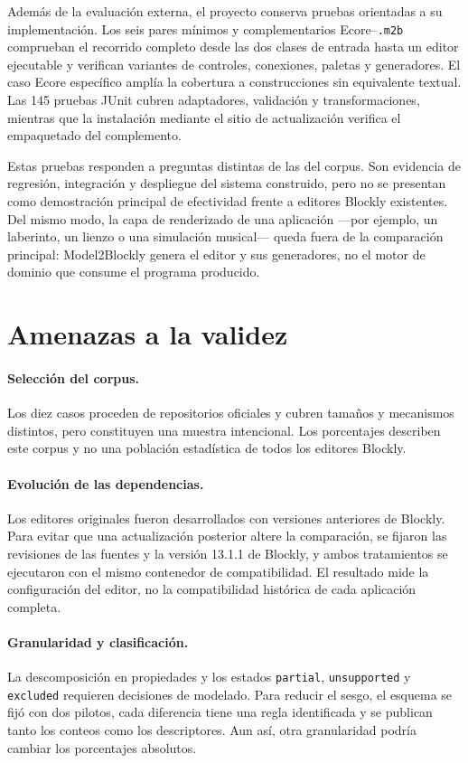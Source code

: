 Además de la evaluación externa, el proyecto conserva pruebas orientadas a su
implementación. Los seis pares mínimos y complementarios
Ecore--\texttt{.m2b} comprueban el recorrido completo desde las dos clases de
entrada hasta un editor ejecutable y verifican variantes de controles,
conexiones, paletas y generadores. El caso Ecore específico amplía la cobertura
a construcciones sin equivalente textual. Las 145 pruebas JUnit cubren
adaptadores, validación y transformaciones, mientras que la instalación mediante
el sitio de actualización verifica el empaquetado del complemento.

Estas pruebas responden a preguntas distintas de las del corpus. Son evidencia
de regresión, integración y despliegue del sistema construido, pero no se
presentan como demostración principal de efectividad frente a editores Blockly
existentes. Del mismo modo, la capa de renderizado de una aplicación ---por
ejemplo, un laberinto, un lienzo o una simulación musical--- queda fuera de la
comparación principal: Model2Blockly genera el editor y sus generadores, no el
motor de dominio que consume el programa producido.

\section{Amenazas a la validez}
\label{sec:amenazas-validez}

\paragraph{Selección del corpus.}
Los diez casos proceden de repositorios oficiales y cubren tamaños y mecanismos
distintos, pero constituyen una muestra intencional. Los porcentajes describen
este corpus y no una población estadística de todos los editores Blockly.

\paragraph{Evolución de las dependencias.}
Los editores originales fueron desarrollados con versiones anteriores de
Blockly. Para evitar que una actualización posterior altere la comparación, se
fijaron las revisiones de las fuentes y la versión 13.1.1 de Blockly, y ambos
tratamientos se ejecutaron con el mismo contenedor de compatibilidad. El
resultado mide la configuración del editor, no la compatibilidad histórica de
cada aplicación completa.

\paragraph{Granularidad y clasificación.}
La descomposición en propiedades y los estados \texttt{partial},
\texttt{unsupported} y \texttt{excluded} requieren decisiones de modelado. Para
reducir el sesgo, el esquema se fijó con dos pilotos, cada diferencia tiene una
regla identificada y se publican tanto los conteos como los descriptores. Aun
así, otra granularidad podría cambiar los porcentajes absolutos.

